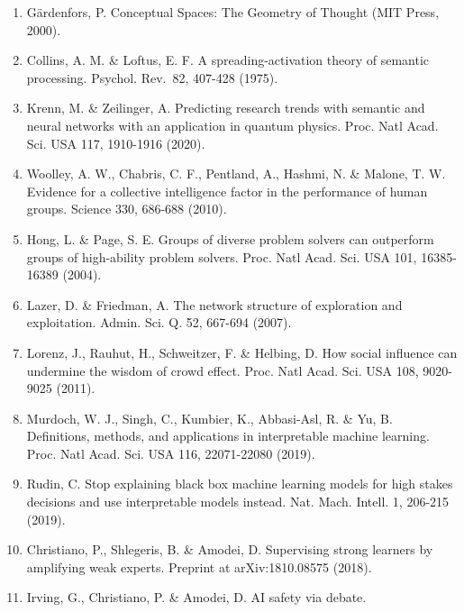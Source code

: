 \begin{enumerate}
\def\labelenumi{\arabic{enumi}.}
\tightlist
\item
  Gärdenfors, P. Conceptual Spaces: The Geometry of Thought (MIT Press,
  2000).\\
\item
  Collins, A. M. \& Loftus, E. F. A spreading-activation theory of
  semantic processing. Psychol. Rev.~82, 407-428 (1975).\\
\item
  Krenn, M. \& Zeilinger, A. Predicting research trends with semantic
  and neural networks with an application in quantum physics. Proc. Natl
  Acad. Sci. USA 117, 1910-1916 (2020).\\
\item
  Woolley, A. W., Chabris, C. F., Pentland, A., Hashmi, N. \& Malone, T.
  W. Evidence for a collective intelligence factor in the performance of
  human groups. Science 330, 686-688 (2010).\\
\item
  Hong, L. \& Page, S. E. Groups of diverse problem solvers can
  outperform groups of high-ability problem solvers. Proc. Natl Acad.
  Sci. USA 101, 16385-16389 (2004).\\
\item
  Lazer, D. \& Friedman, A. The network structure of exploration and
  exploitation. Admin. Sci. Q. 52, 667-694 (2007).\\
\item
  Lorenz, J., Rauhut, H., Schweitzer, F. \& Helbing, D. How social
  influence can undermine the wisdom of crowd effect. Proc. Natl Acad.
  Sci. USA 108, 9020-9025 (2011).\\
\item
  Murdoch, W. J., Singh, C., Kumbier, K., Abbasi-Asl, R. \& Yu, B.
  Definitions, methods, and applications in interpretable machine
  learning. Proc. Natl Acad. Sci. USA 116, 22071-22080 (2019).\\
\item
  Rudin, C. Stop explaining black box machine learning models for high
  stakes decisions and use interpretable models instead. Nat. Mach.
  Intell. 1, 206-215 (2019).\\
\item
  Christiano, P., Shlegeris, B. \& Amodei, D. Supervising strong
  learners by amplifying weak experts. Preprint at arXiv:1810.08575
  (2018).\\
\item
  Irving, G., Christiano, P. \& Amodei, D. AI safety via debate.

\end{enumerate}
